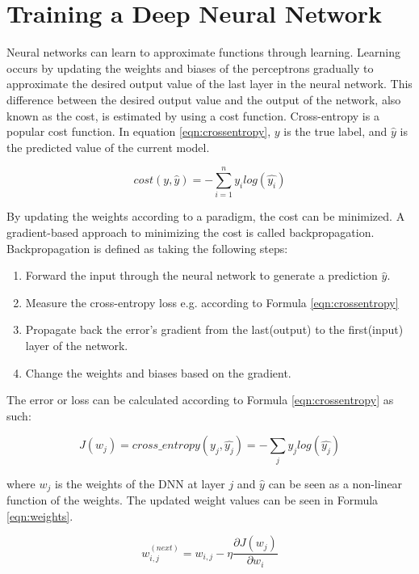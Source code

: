 \documentclass[english, bibtex]{kththesis}
\begin{document}
\section{Training a Deep Neural Network}

Neural networks can learn to approximate functions through learning. Learning occurs by updating the weights and biases of the perceptrons gradually to approximate the desired output value of the last layer in the neural network. This difference between the desired output value and the output of the network, also known as the cost, is estimated by using a cost function. Cross-entropy is a popular cost function. In equation \ref{eqn:crossentropy}, \(y\) is the true label, and \(\hat{y}\) is the predicted value of the current model.

\begin{equation}
	cost(y, \hat{y}) = - \sum\limits_{i=1}^{n} y_i log(\hat{y_i})
  	\label{eqn:crossentropy}
\end{equation}

By updating the weights according to a paradigm, the cost can be minimized. A gradient-based approach to minimizing the cost is called backpropagation\cite{Rumelhart1986}. Backpropagation is defined as taking the following steps:

\begin{enumerate}
\item Forward the input through the neural network to generate a prediction $\hat{y}$.
\item Measure the cross-entropy loss e.g. according to Formula \ref{eqn:crossentropy} 
\item Propagate back the error’s gradient from the last(output) to the first(input) layer of the network.
\item Change the weights and biases based on the gradient.
\end{enumerate}

The error or loss can be calculated according to Formula \ref{eqn:crossentropy} as such: 

\begin{equation}
	J(w_j) = cross\_entropy(y_j,\hat{y_j}) = - \sum_{j} y_j log(\hat{y_j})
  	\label{eqn:jacobian}
\end{equation}


where $w_j$ is the weights of the DNN at layer $j$ and $\hat{y}$ can be seen as a non-linear function of the weights. The updated weight values can be seen in Formula \ref{eqn:weights}. 

\begin{equation}
	w_{i,j}^{(next)} = w_{i,j} - \eta \frac{\partial J(w_j)}{\partial w_i}
  	\label{eqn:weights}
\end{equation}
\end{document}
